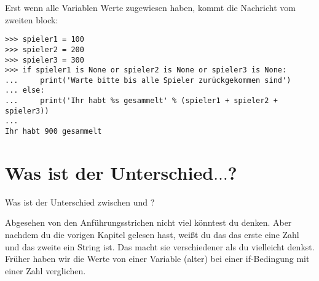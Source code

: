 \noindent
Erst wenn alle Variablen Werte zugewiesen haben, kommt die Nachricht vom zweiten block:

\begin{listing}
\begin{verbatim}
>>> spieler1 = 100
>>> spieler2 = 200
>>> spieler3 = 300
>>> if spieler1 is None or spieler2 is None or spieler3 is None:
...     print('Warte bitte bis alle Spieler zurückgekommen sind')
... else:
...     print('Ihr habt %s gesammelt' % (spieler1 + spieler2 + spieler3))
...
Ihr habt 900 gesammelt
\end{verbatim}
\end{listing}

\section{Was ist der Unterschied$\ldots$?}\label{whatsthedifference}

Was ist der Unterschied zwischen  und ?
\par
Abgesehen von den Anführungsstrichen nicht viel könntest du denken.  Aber nachdem du die vorigen Kapitel gelesen hast, weißt du das das erste eine Zahl und das zweite ein String ist. Das macht sie verschiedener als du vielleicht denkst. Früher haben wir die Werte von einer Variable (alter) bei einer if-Bedingung mit einer Zahl verglichen.

